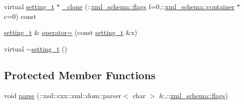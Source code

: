 \begin{DoxyCompactItemize}
virtual \hyperlink{classsetting__t}{setting\+\_\+t} $\ast$ \hyperlink{classsetting__t_a9ed33e6afef2f40ab748a8f769395f16}{\+\_\+clone} (\+::\hyperlink{namespacexml__schema_a0612287d030cb2732d31a45b258fdc87}{xml\+\_\+schema\+::flags} f=0,\+::\hyperlink{namespacexml__schema_ada9aa30dc722e93ee2ed7243085402a5}{xml\+\_\+schema\+::container} $\ast$c=0) const 
\item 
\hyperlink{classsetting__t}{setting\+\_\+t} \& \hyperlink{classsetting__t_a1a65e0d78b58441104ec055833e0abc0}{operator=} (const \hyperlink{classsetting__t}{setting\+\_\+t} \&x)
\item 
virtual \hyperlink{classsetting__t_a7120aedc485283df96077450135eec44}{$\sim$setting\+\_\+t} ()
\end{DoxyCompactItemize}
\subsection*{Protected Member Functions}
\begin{DoxyCompactItemize}
\item 
void \hyperlink{classsetting__t_a575b033d56289ae9496956d481eb6118}{parse} (\+::xsd\+::cxx\+::xml\+::dom\+::parser$<$ char $>$ \&,\+::\hyperlink{namespacexml__schema_a0612287d030cb2732d31a45b258fdc87}{xml\+\_\+schema\+::flags})
\end{DoxyCompactItemize}
